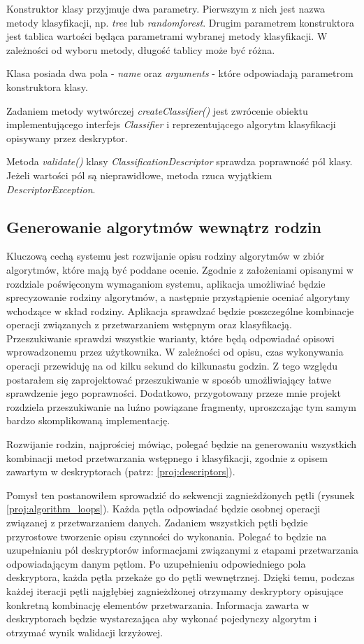 \documentclass[../thesis.tex]{subfiles}
\begin{document}
Konstruktor klasy przyjmuje dwa parametry. Pierwszym z nich jest nazwa metody klasyfikacji, np. \emph{tree} lub \emph{randomforest}. Drugim parametrem konstruktora jest tablica wartości będąca parametrami wybranej metody klasyfikacji. W zależności od wyboru metody, długość tablicy może być różna.

Klasa posiada dwa pola - \emph{name} oraz \emph{arguments} - które odpowiadają parametrom konstruktora klasy.

Zadaniem metody wytwórczej \emph{createClassifier()} jest zwrócenie obiektu implementującego interfejs \emph{Classifier} i reprezentującego algorytm klasyfikacji opisywany przez deskryptor.

Metoda \emph{validate()} klasy \emph{ClassificationDescriptor} sprawdza poprawność pól klasy. Jeżeli wartości pól są nieprawidłowe, metoda rzuca wyjątkiem \emph{DescriptorException}.

\subsection{Generowanie algorytmów wewnątrz rodzin}

Kluczową cechą systemu jest rozwijanie opisu rodziny algorytmów w zbiór algorytmów, które mają być poddane ocenie. Zgodnie z założeniami opisanymi w rozdziale poświęconym wymaganiom systemu, aplikacja umożliwiać będzie sprecyzowanie rodziny algorytmów, a następnie przystąpienie oceniać algorytmy wchodzące w skład rodziny. Aplikacja sprawdzać będzie poszczególne kombinacje operacji związanych z przetwarzaniem wstępnym oraz klasyfikacją. Przeszukiwanie sprawdzi wszystkie warianty, które będą odpowiadać opisowi wprowadzonemu przez użytkownika. W zależności od opisu, czas wykonywania operacji przewiduję na od kilku sekund do kilkunastu godzin. Z tego względu postarałem się zaprojektować przeszukiwanie w sposób umożliwiający łatwe sprawdzenie jego poprawności. Dodatkowo, przygotowany przeze mnie projekt rozdziela przeszukiwanie na luźno powiązane fragmenty, uproszczając tym samym bardzo skomplikowaną implementację.

Rozwijanie rodzin, najprościej mówiąc, polegać będzie na generowaniu wszystkich kombinacji metod przetwarzania wstępnego i klasyfikacji, zgodnie z opisem zawartym w deskryptorach (patrz: \ref{proj:descriptors}).

Pomysł ten postanowiłem sprowadzić do sekwencji zagnieżdżonych pętli (rysunek \ref{proj:algorithm_loops}). Każda pętla odpowiadać będzie osobnej operacji związanej z przetwarzaniem danych. Zadaniem wszystkich pętli będzie przyrostowe tworzenie opisu czynności do wykonania. Polegać to będzie na uzupełnianiu pól deskryptorów informacjami związanymi z etapami przetwarzania odpowiadającym danym pętlom. Po uzupełnieniu odpowiedniego pola deskryptora, każda pętla przekaże go do pętli wewnętrznej. Dzięki temu, podczas każdej iteracji pętli najgłębiej zagnieżdżonej otrzymamy deskryptory opisujące konkretną kombinację elementów przetwarzania. Informacja zawarta w deskryptorach będzie wystarczająca aby wykonać pojedynczy algorytm i otrzymać wynik walidacji krzyżowej. 
\end{document}
